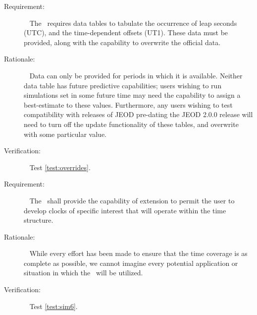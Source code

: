 \label{reqt:backwardcompatibility}
\begin{description}
  \item[Requirement:]\ \newline
    The \timeDesc\ requires data tables to tabulate the occurrence of 
    leap seconds (UTC), and the time-dependent offsets (UT1).  These data must 
    be provided, along with the capability to overwrite the official data.
  \item[Rationale:]\ \newline
    Data can only be provided for periods in which it is available.  Neither 
    data table has future predictive capabilities; users wishing to run 
    simulations set in some future time may need the capability to assign a 
    best-estimate to these values.  Furthermore, any users wishing to test 
    compatibility with releases of JEOD pre-dating the JEOD 2.0.0 release will 
    need to turn off the update functionality of these tables, and overwrite 
    with some particular value.
  \item[Verification:]\ \newline
	  Test \vref{test:overrides}.
\end{description}


\label{reqt:extensibility}
\begin{description}
  \item[Requirement:]\ \newline
    The \timeDesc\ shall provide the capability of extension to permit the user
    to develop clocks of specific interest that will operate within the time
    structure.
  \item[Rationale:]\ \newline
   While every effort has been made to ensure that the time coverage is as
   complete as possible, we cannot imagine every potential application or
   situation in which the \timeDesc\ will be utilized. 
  \item[Verification:]\ \newline
	  Test \vref{test:sim6}.
\end{description}
